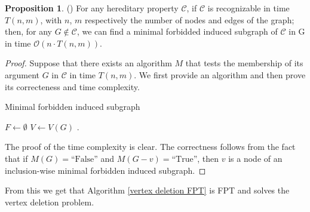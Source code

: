 \documentclass{article}
\theoremstyle{definition}
\newtheorem{prop}[thm]{Proposition}
\begin{document}
    \begin{prop} \label{FPT-prop_1} (\cite{FPT-algos})
        For any hereditary property $\mathcal{C}$,
        if $\mathcal{C}$ is recognizable
        in time $T\left(n, m\right)$, with
        $n$, $m$ respectively the number of nodes and edges
        of the graph; then, for any $G \not \in \mathcal{C}$,
        we can find a minimal forbidded induced
        subgraph of $\mathcal{C}$ in G in time 
        $\mathcal{O} \left(n \cdot T\left(n, m\right)\right)$.  \end{prop}
    \begin{proof} 
        Suppose that there exists an algorithm $M$ that tests
        the membership of its argument $G$ in $\mathcal{C}$ in time
        $T\left(n, m\right)$.
        We first provide an algorithm and then prove its correcteness
        and time complexity.

        \begin{algorithm}
            \caption{Minimal forbidden induced subgraph}
            \label{forbid subgraph}

           

            $F \gets \emptyset$\;
            $V \gets V\left(G\right)$\;
            .
        \end{algorithm}
    The proof of the time complexity is clear.  
    The correctness follows from the fact that if
    $M\left(G\right) = \text{``False''}$ and $M\left(G - v\right) = \text{``True''}$,
    then $v$ is a node of an inclusion-wise minimal forbidden induced subgraph.
    \end{proof}
    
    From this we get that Algorithm \ref{vertex deletion FPT}
    is FPT and solves the vertex deletion problem. 
    
\end{document}
